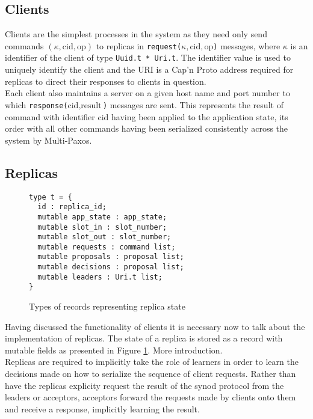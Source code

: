 \subsection{Clients}

Clients are the simplest processes in the system as they need only send commands $\left(\kappa, \textrm{cid}, \textrm{op} \right)$ to replicas in \texttt{request($\kappa, \textrm{cid}, \textrm{op}$)} messages, where $\kappa$ is an identifier of the client of type \texttt{Uuid.t * Uri.t}. The identifier value is used to uniquely identify the client and the URI is a Cap'n Proto address required for replicas to direct their responses to clients in question. \\

Each client also maintains a server on a given host name and port number to which \texttt{response($\textrm{cid}, \textrm{result}$)} messages are sent. This represents the result of command with identifier $\textrm{cid}$ having been applied to the application state, its order with all other commands having been serialized consistently across the system by Multi-Paxos.

\subsection{Replicas}

\begin{figure}
\begin{lstlisting}
type t = {
  id : replica_id;
  mutable app_state : app_state;
  mutable slot_in : slot_number;
  mutable slot_out : slot_number;
  mutable requests : command list;
  mutable proposals : proposal list;
  mutable decisions : proposal list;
  mutable leaders : Uri.t list;
}
\end{lstlisting}
\centering
\caption{Types of records representing replica state}
\label{fig:replica-types}
\end{figure}

Having discussed the functionality of clients it is necessary now to talk about the implementation of replicas. The state of a replica is stored as a record with mutable fields as presented in Figure \ref{fig:replica-types}. More introduction. \\

Replicas are required to implicitly take the role of learners in order to learn the decisions made on how to serialize the sequence of client requests. Rather than have the replicas explicity request the result of the synod protocol from the leaders or acceptors, acceptors forward the requests made by clients onto them and receive a response, implicitly learning the result. \\

